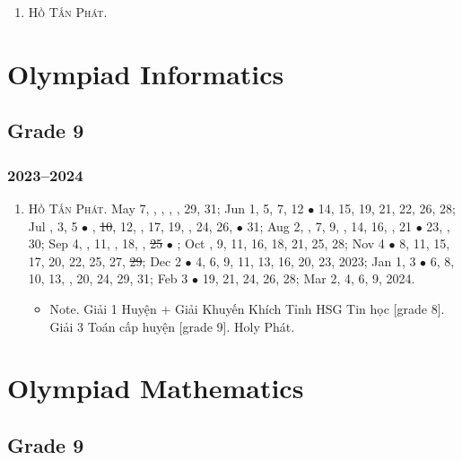 \documentclass{article}
\begin{document}
\begin{enumerate}
	\item \textsc{Hồ Tấn Phát.}
\end{enumerate}


\section{Olympiad Informatics}

\subsection{Grade 9}

\subsubsection{2023--2024}

\begin{enumerate}
	\item \textsc{Hồ Tấn Phát.} May 7, , , , , 29, 31; Jun 1, 5, 7, 12 $\bullet$ 14, 15, 19, 21, 22, 26, 28; Jul , 3, 5 $\bullet$ , \st{10}, 12, , 17, 19, , 24, 26,  $\bullet$ 31; Aug 2, , 7, 9, , 14, 16, , 21 $\bullet$ 23, , 30; Sep 4, , 11, , 18, , \st{25} $\bullet$ ; Oct , 9, 11, 16, 18, 21, 25, 28; Nov 4 $\bullet$ 8, 11, 15, 17, 20, 22, 25, 27, \st{29}; Dec 2 $\bullet$ 4, 6, 9, 11, 13, 16, 20, 23, 2023; Jan 1, 3 $\bullet$ 6, 8, 10, 13, , 20, 24, 29, 31; Feb 3 $\bullet$ 19, 21, 24, 26, 28; Mar 2, 4, 6, 9, 2024.
	\begin{itemize}
		\item {\sf Note.} Giải 1 Huyện $+$ Giải Khuyến Khích Tỉnh HSG Tin học [grade 8]. Giải 3 Toán cấp huyện [grade 9]. Holy Phát.
	\end{itemize}
\end{enumerate}


\section{Olympiad Mathematics}

\subsection{Grade 9}
\end{document}

